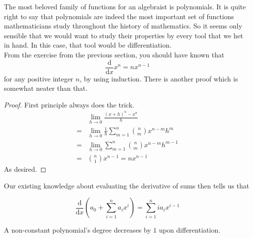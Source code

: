 The most beloved family of functions for an algebraist is polynomials.
It is quite right to say that polynomials are indeed the most important set of functions mathematicians study throughout the history of mathematics.
So it seems only sensible that we would want to study their properties by every tool that we het in hand.
In this case, that tool would be differentiation.\\
From the exercise from the previous section, you should have known that
$$\frac{\mathrm d}{\mathrm dx}x^n=nx^{n-1}$$
for any positive integer $n$, by using induction.
There is another proof which is somewhat neater than that.
\begin{proof}
    First principle always does the trick.
    \begin{align*}
        &\lim_{h\to0}\frac{(x+h)^n-x^n}{h}\\
        =&\lim_{h\to0}\frac{1}{h}\sum_{m=1}^n\binom{n}{m}x^{n-m}h^m\\
        =&\lim_{h\to0}\sum_{m=1}^n\binom{n}{m}x^{n-m}h^{m-1}\\
        =&\binom{n}{1}x^{n-1}=nx^{n-1}
    \end{align*}
    As desired.
\end{proof}
Our existing knowledge about evaluating the derivative of sums then tells us that
\begin{theorem}
    $$\frac{\mathrm d}{\mathrm dx}\left(a_0+\sum_{i=1}^{n}a_ix^i\right)=\sum_{i=1}^{n}ia_ix^{i-1}$$
\end{theorem}
\begin{corollary}
    A non-constant polynomial's degree decreases by $1$ upon differentiation.
\end{corollary}
